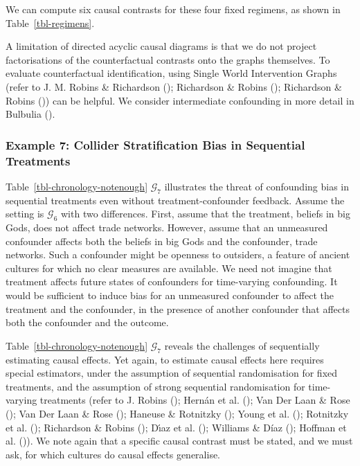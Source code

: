 \documentclass[
  single column]{article}
\begin{document}
We can compute six causal contrasts for these four fixed regimens, as
shown in Table~\ref{tbl-regimens}.

A limitation of directed acyclic causal diagrams is that we do not
project factorisations of the counterfactual contrasts onto the graphs
themselves. To evaluate counterfactual identification, using Single
World Intervention Graphs (refer to J. M. Robins \& Richardson
(); Richardson \& Robins
(); Richardson \& Robins
()) can be helpful. We
consider intermediate confounding in more detail in Bulbulia
().

\subsubsection{Example 7: Collider Stratification Bias in Sequential
Treatments}\label{example-7-collider-stratification-bias-in-sequential-treatments}

Table~\ref{tbl-chronology-notenough} \(\mathcal{G}_7\) illustrates the
threat of confounding bias in sequential treatments even without
treatment-confounder feedback. Assume the setting is \(\mathcal{G}_6\)
with two differences. First, assume that the treatment, beliefs in big
Gods, does not affect trade networks. However, assume that an unmeasured
confounder affects both the beliefs in big Gods and the confounder,
trade networks. Such a confounder might be openness to outsiders, a
feature of ancient cultures for which no clear measures are available.
We need not imagine that treatment affects future states of confounders
for time-varying confounding. It would be sufficient to induce bias for
an unmeasured confounder to affect the treatment and the confounder, in
the presence of another confounder that affects both the confounder and
the outcome.

Table~\ref{tbl-chronology-notenough} \(\mathcal{G}_7\) reveals the
challenges of sequentially estimating causal effects. Yet again, to
estimate causal effects here requires special estimators, under the
assumption of sequential randomisation for fixed treatments, and the
assumption of strong sequential randomisation for time-varying
treatments (refer to J. Robins (); Hernán
et al. (); Van Der Laan \& Rose
(); Van Der Laan \& Rose
(); Haneuse \& Rotnitzky
(); Young et al.
(); Rotnitzky et al.
(); Richardson \& Robins
(); Dı́az et al.
(); Williams \& Díaz
(); Hoffman et al.
()). We note again that a specific
causal contrast must be stated, and we must ask, for which cultures do
causal effects generalise.
\end{document}
